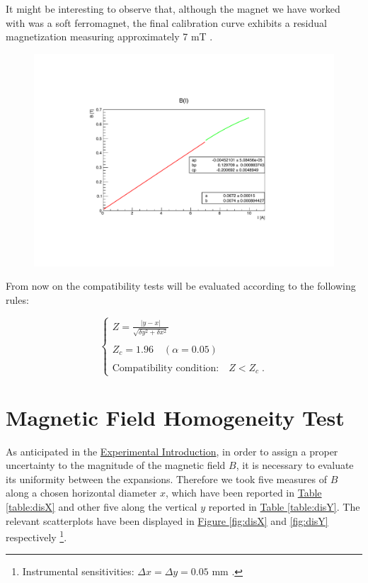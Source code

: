 \documentclass[a4paper,12pt,abstracton]{scrartcl}
\begin{document}
It might be interesting to observe that, although the magnet we have worked with was a soft ferromagnet, the final calibration curve exhibits a residual magnetization measuring approximately 7 mT . 

\begin{figure}[H]
    \centering
    \includegraphics[scale=0.8]{plots/curva.pdf}
    \caption{}
    \label{fig:calcurve}
\end{figure}
From now on the compatibility tests will be evaluated according to the following rules: 

$$\begin{cases}
Z=\frac{|y-x|}{\sqrt{\delta y^2+ \delta x^2}} \\\\
Z_c = 1.96 \quad(\alpha=0.05) \\\\
\text{Compatibility condition:}\quad Z < Z_c\; .
\end{cases}
$$

\clearpage
\section{Magnetic Field Homogeneity Test}\label{sec: MagHom}
As anticipated in the \hyperref[sec: ExpIntro]{Experimental Introduction}, in order to assign a proper uncertainty to the magnitude of the magnetic field $B$, it is necessary to evaluate its uniformity between the expansions. Therefore we took five measures of $B$ along a chosen horizontal diameter $x$, which have been reported in \hyperref[table:disX]{Table \ref*{table:disX}} and other five along the vertical $y$ reported in \hyperref[table:disY]{Table \ref*{table:disY}}. The relevant scatterplots have been displayed in \hyperref[fig:disX]{Figure \ref*{fig:disX}} and \hyperref[fig:disY]{ \ref*{fig:disY}} respectively \footnote{Instrumental sensitivities: $\Delta x = \Delta y = 0.05$ mm .}.
\end{document}
